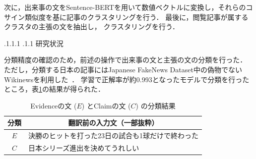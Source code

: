\documentclass[a4paper, twocolumn, 10pt]{jarticle}
\makeatletter
\def\section{%
	\@startsection{section}{1}{\z@}%
	{.1\Cvs \@plus.1\Cdp \@minus.1\Cdp}%
	{.1\Cvs \@plus.1\Cdp}%
	{\normalfont\normalsize\bfseries}%
}
\makeatother
\begin{document}
次に，出来事の文をSentence-BERTを用いて数値ベクトルに変換し，それらのコサイン類似度を基に記事のクラスタリングを行う．
最後に，閲覧記事が属するクラスタの主張の文を抽出し，
クラスタリングを行う．








\section{研究状況}

分類精度の確認のため，前述の操作で出来事の文と主張の文の分類を行った．
ただし，分類する日本の記事にはJapanese FakeNews Dataset中の偽物でないWikinewsを利用した~\cite{japanese_fakenews_dataset}．
学習で正解率が約0.993となったモデルで分類を行ったところ，表\ref{classify_result}の結果が得られた．


\begin{table}[h]
  \caption{Evidenceの文 ($E$) とClaimの文 ($C$) の分類結果}
  \label{classify_result}
  \centering
  \begin{tabular}{cp{6cm}}
    \hline
    分類 & \multicolumn{1}{c}{翻訳前の入力文（一部抜粋）}  \\
    \hline \hline
    $E$  & 決勝のヒットを打った23日の試合も1球だけで終わった \\
    $C$  & 日本シリーズ進出を決めてうれしい \\
    \hline
  \end{tabular}
\end{table}
\end{document}
